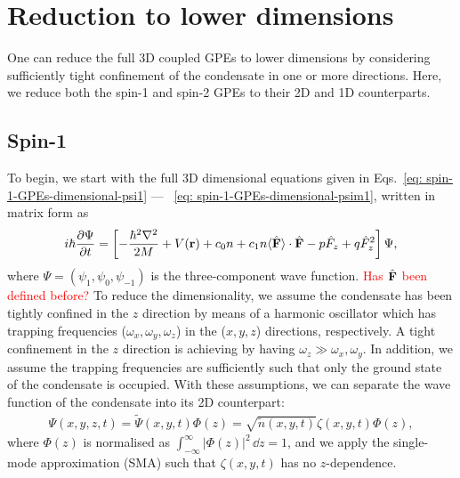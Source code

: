 \section{Reduction to lower dimensions}
One can reduce the full 3D coupled GPEs to lower dimensions by considering
sufficiently tight confinement of the condensate in one or more directions.
Here, we reduce both the spin-1 and spin-2 GPEs to their 2D and 1D counterparts.

\subsection{Spin-1}
To begin, we start with the full 3D dimensional equations given in
Eqs.~\eqref{eq: spin-1-GPEs-dimensional-psi1} ---
~\eqref{eq: spin-1-GPEs-dimensional-psim1}, written in matrix form as
\begin{align}\label{eq: spin-1-GPEs-matrix}
    i\hbar \pdv{\Psi}{t} = \left[-\frac{\hbar^2\nabla^2}{2M} + V(\vb{r}) + c_0n
    + c_1n \langle\hat{\vb{F}}\rangle \cdot \hat{\vb{F}} - p\hat{F}_z
    + q\hat{F}_z^2\right]\Psi,
\end{align}
where \(\Psi=(\psi_1, \psi_0, \psi_{-1})\) is the three-component wave function.
\textcolor{red}{Has \(\hat{\vb{F}}\) been defined before?}
To reduce the dimensionality, we assume the condensate has been tightly confined
in the \(z\) direction by means of a harmonic oscillator which has trapping
frequencies (\(\omega_x, \omega_y, \omega_z\)) in the (\(x, y, z\)) directions,
respectively.
A tight confinement in the \(z\) direction is achieving by having
\(\omega_z \gg \omega_x, \omega_y\).
In addition, we assume the trapping frequencies are sufficiently such that only
the ground state of the condensate is occupied.
With these assumptions, we can separate the wave function of the condensate into
its 2D counterpart:
\begin{align}\label{eq: Psi-2D}
    \Psi(x, y, z, t) = \tilde{\Psi}(x, y, t)\Phi(z)
    = \sqrt{\tilde{n}(x, y, t)}\zeta(x, y, t)\Phi(z),
\end{align}
where \(\Phi(z)\) is normalised as \(\int_{-\infty}^{\infty}|\Phi(z)|^2 \, \dd z
= 1\), and we apply the single-mode approximation (SMA) such that
\(\zeta(x, y, t)\) has no \(z\)-dependence.


